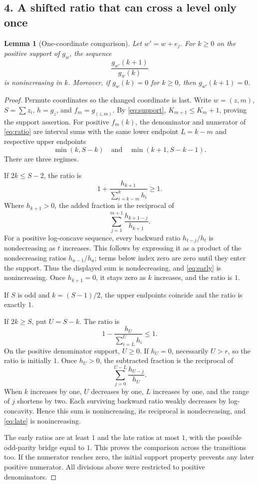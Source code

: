\documentclass[11pt]{article}
\newtheorem{lemma}{Lemma}
\begin{document}
\subsection*{4. A shifted ratio that can cross a level only once}
\begin{lemma}[One-coordinate comparison]\label{lem:one}
Let $w'=w+e_j$. For $k\ge0$ on the positive support of $g_w$, the sequence
\begin{equation}\label{eq:ratio}
 \frac{g_{w'}(k+1)}{g_w(k)}
\end{equation}
is nonincreasing in $k$. Moreover, if $g_w(k)=0$ for $k\ge0$, then
$g_{w'}(k+1)=0$.
\end{lemma}
\begin{proof}
Permute coordinates so the changed coordinate is last. Write $w=(z,m)$,
$S=\sum z_i$, $h=g_z$, and $f_m=g_{(z,m)}$.
By \eqref{eq:support}, $K_{m+1}\le K_m+1$, proving the support assertion.
For positive $f_m(k)$, the denominator and numerator of \eqref{eq:ratio}
are interval sums with the same lower endpoint $L=k-m$ and respective
upper endpoints
\[
 \min(k,S-k)\quad\text{and}\quad\min(k+1,S-k-1).
\]
There are three regimes.

If $2k\le S-2$, the ratio is
\begin{equation}\label{eq:early}
 1+\frac{h_{k+1}}{\sum_{i=k-m}^k h_i}\ge1.
\end{equation}
Where $h_{k+1}>0$, the added fraction is the reciprocal of
\[
 \sum_{j=1}^{m+1}\frac{h_{k+1-j}}{h_{k+1}}.
\]
For a positive log-concave sequence, every backward ratio
$h_{t-j}/h_t$ is nondecreasing as $t$ increases. This follows by expressing
it as a product of the nondecreasing ratios $h_{a-1}/h_a$; terms below
index zero are zero until they enter the support. Thus the displayed sum
is nondecreasing, and \eqref{eq:early} is nonincreasing. Once
$h_{k+1}=0$, it stays zero as $k$ increases, and the ratio is $1$.

If $S$ is odd and $k=(S-1)/2$, the upper endpoints coincide and the
ratio is exactly $1$.

If $2k\ge S$, put $U=S-k$. The ratio is
\begin{equation}\label{eq:late}
 1-\frac{h_U}{\sum_{i=L}^U h_i}\le1.
\end{equation}
On the positive denominator support, $U\ge0$. If $h_U=0$, necessarily
$U>r$, so the ratio is initially $1$. Once $h_U>0$, the subtracted
fraction is the reciprocal of
\[
 \sum_{j=0}^{U-L}\frac{h_{U-j}}{h_U}.
\]
When $k$ increases by one, $U$ decreases by one, $L$ increases by one,
and the range of $j$ shortens by two. Each surviving backward ratio
weakly decreases by log-concavity. Hence this sum is nonincreasing, its
reciprocal is nondecreasing, and \eqref{eq:late} is nonincreasing.

The early ratios are at least $1$ and the late ratios at most $1$, with
the possible odd-parity bridge equal to $1$. This proves the comparison
across the transitions too. If the numerator reaches zero, the initial
support property prevents any later positive numerator. All divisions
above were restricted to positive denominators.
\end{proof}
\end{document}
